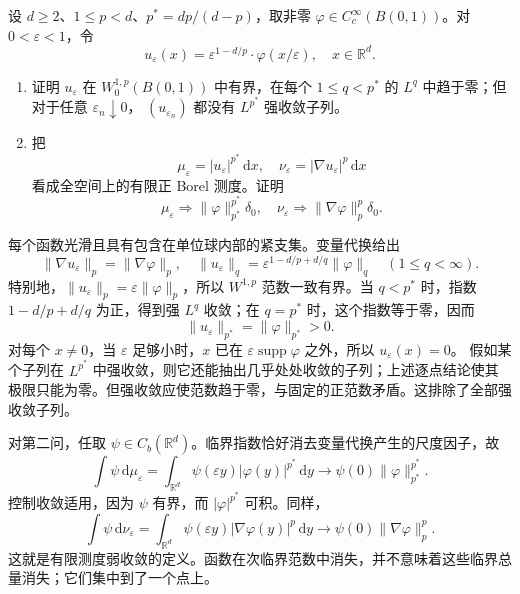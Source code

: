 \begin{optionalexercise}\label{b1:ex:25-critical-mass-concentration}
设 \(d\ge2\)、\(1\le p<d\)、\(p^*=dp/(d-p)\)，取非零
\(\varphi\in C_c^\infty(B(0,1))\)。对 \(0<\varepsilon<1\)，令
\[
 u_\varepsilon(x)=\varepsilon^{1-d/p}\cdot \varphi(x/\varepsilon),
 \quad x\in\mathbb R^d.
\]
\begin{enumerate}
 \item\label{b1:item:25-critical-no-strong-subsequence}
 证明 \(u_\varepsilon\) 在 \(W_0^{1,p}(B(0,1))\) 中有界，在每个
 \(1\le q<p^*\) 的 \(L^q\) 中趋于零；但对于任意 \(\varepsilon_n\downarrow0\)，
 \((u_{\varepsilon_n})\) 都没有 \(L^{p^*}\) 强收敛子列。
 \item\label{b1:item:25-critical-defect-measures}
 把
 \[
  \mu_\varepsilon=|u_\varepsilon|^{p^*}\,\mathrm dx,\quad
  \nu_\varepsilon=|\nabla u_\varepsilon|^p\,\mathrm dx
 \]
 看成全空间上的有限正 Borel 测度。证明
 \[
  \mu_\varepsilon\Rightarrow
      \|\varphi\|_{p^*}^{p^*}\delta_0,
  \quad
  \nu_\varepsilon\Rightarrow
      \|\nabla\varphi\|_p^p\delta_0.
 \]
\end{enumerate}
\end{optionalexercise}
\begin{solution}
每个函数光滑且具有包含在单位球内部的紧支集。变量代换给出
\[
 \|\nabla u_\varepsilon\|_p=\|\nabla\varphi\|_p,
 \quad
 \|u_\varepsilon\|_q
  =\varepsilon^{1-d/p+d/q}\|\varphi\|_q
                      \quad(1\le q<\infty).
\]
特别地，\(\|u_\varepsilon\|_p=\varepsilon\|\varphi\|_p\)，所以
\(W^{1,p}\) 范数一致有界。当 \(q<p^*\) 时，指数
\(1-d/p+d/q\) 为正，得到强 \(L^q\) 收敛；在 \(q=p^*\) 时，这个指数等于零，因而
\[
 \|u_\varepsilon\|_{p^*}=\|\varphi\|_{p^*}>0.
\]
对每个 \(x\ne0\)，当 \(\varepsilon\) 足够小时，\(x\) 已在
\(\varepsilon\operatorname{supp}\varphi\) 之外，所以 \(u_\varepsilon(x)=0\)。
假如某个子列在 \(L^{p^*}\) 中强收敛，则它还能抽出几乎处处收敛的子列；上述逐点结论使其极限只能为零。但强收敛应使范数趋于零，与固定的正范数矛盾。这排除了全部强收敛子列。

对第二问，任取 \(\psi\in C_b(\mathbb R^d)\)。临界指数恰好消去变量代换产生的尺度因子，故
\[
 \int\psi\,\mathrm d\mu_\varepsilon
    =\int_{\mathbb R^d}\psi(\varepsilon y)|\varphi(y)|^{p^*}\,\mathrm dy
    \longrightarrow\psi(0)\|\varphi\|_{p^*}^{p^*}.
\]
控制收敛适用，因为 \(\psi\) 有界，而 \(|\varphi|^{p^*}\) 可积。同样，
\[
 \int\psi\,\mathrm d\nu_\varepsilon
    =\int_{\mathbb R^d}\psi(\varepsilon y)|\nabla\varphi(y)|^p\,\mathrm dy
    \longrightarrow\psi(0)\|\nabla\varphi\|_p^p.
\]
这就是有限测度弱收敛的定义。函数在次临界范数中消失，并不意味着这些临界总量消失；它们集中到了一个点上。
\end{solution}

